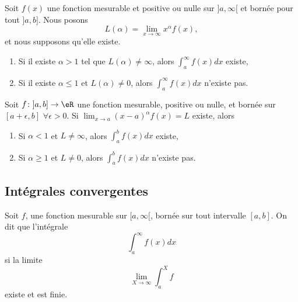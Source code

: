 \begin{corollary}			\label{CorCritFonsTest}
	Soit \( f(x)\) une fonction mesurable et positive ou nulle sur \( ]a,\infty[\) et bornée pour tout \( ]a,b]\). Nous posons
	\begin{equation}
		L(\alpha)=\lim_{x\to\infty}x^{\alpha}f(x),
	\end{equation}
	et nous supposons qu'elle existe.
	\begin{enumerate}
		\item Si il existe \( \alpha>1\) tel que \( L(\alpha)\neq\infty\), alors \( \int_a^{\infty}f(x)dx\) existe,
		\item Si il existe \( \alpha\leq1\) et \( L(\alpha)\neq 0\), alors \( \int_a^{\infty}f(x)dx\) n'existe pas.
	\end{enumerate}
\end{corollary}

\begin{corollary}		\label{CorAlphaLCasInteabf}
	Soit \( f\colon ]a,b]\to \eR\) une fonction mesurable, positive ou nulle, et bornée sur \( [a+\epsilon,b]\) \( \forall\epsilon>0\). Si \( \lim_{x\to a}(x-a)^{\alpha}f(x)=L\) existe, alors
	\begin{enumerate}
		\item Si \( \alpha<1\) et \( L\neq\infty\), alors \( \int_a^bf(x)dx\) existe,
		\item Si \( \alpha\geq 1\) et \( L\neq 0\), alors \( \int_a^bf(x)dx\) n'existe pas.
	\end{enumerate}
\end{corollary}

\subsection{Intégrales convergentes}

\begin{definition}
	Soit \( f\), une fonction mesurable sur \( [a,\infty[\), bornée sur tout intervalle \( [a,b]\). On dit que l'intégrale
	\begin{equation}
		\int_a^{\infty}f(x)dx
	\end{equation}
	 si la limite
	\begin{equation}		\label{EqDEfConvergeZeroInftX}
		\lim_{X\to\infty}\int_a^{X}f
	\end{equation}
	existe et est finie.
\end{definition}
